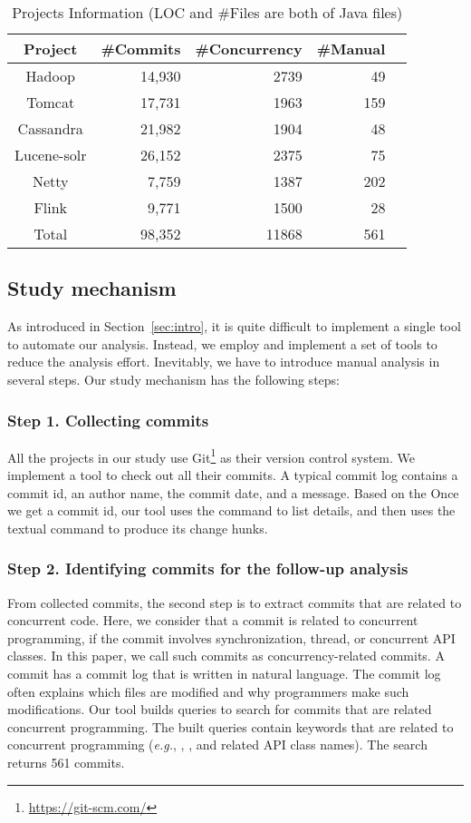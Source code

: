 \begin{table}
	\centering
	\caption{Projects Information (LOC and \#Files are both of Java files)}
    \label{table:dataset}
	\begin{tabular}{|c|r|r|r|r|}\hline
		Project&\#Commits&\#Concurrency&\#Manual\\\hline
		Hadoop&14,930&2739&49\\
		Tomcat&17,731&1963&159\\
		Cassandra&21,982&1904&48\\
		Lucene-solr&26,152&2375&75\\
		Netty&7,759&1387&202\\
		Flink&9,771&1500&28\\\hline
		Total&98,352&11868&561\\\hline
	\end{tabular}
\end{table}

\subsection{Study mechanism}
\label{sec:method:tool}
As introduced in Section~\ref{sec:intro}, it is quite difficult to implement a single tool to automate our analysis. Instead, we employ and implement a set of tools to reduce the analysis effort. Inevitably, we have to introduce manual analysis in several steps. Our study mechanism has the following steps:

\subsubsection{Step 1. Collecting commits} All the projects in our study use Git\footnote{\url{https://git-scm.com/}} as their version control system. We implement a tool to check out all their commits. A typical commit log contains a commit id, an author name, the commit date, and a message. Based on the Once we get a commit id, our tool uses the  command to list details, and then uses the textual  command to produce its change hunks.

\subsubsection{Step 2. Identifying commits for the follow-up analysis} From collected commits, the second step is to extract commits that are related to concurrent code. Here, we consider that a commit is related to concurrent programming, if the commit involves synchronization, thread, or concurrent API classes. In this paper, we call such commits as concurrency-related commits. A commit has a commit log that is written in natural language. The commit log often explains which files are modified and why programmers make such modifications. Our tool builds queries to search for commits that are related concurrent programming. The built queries contain keywords that are related to concurrent programming (\emph{e.g.}, , , and related API class names). The search returns 561 commits.

